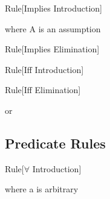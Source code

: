 \begin{namedthm}{Rule}[Implies Introduction]

\begin{bprooftree}
\end{bprooftree}\qquad where A is an assumption

\end{namedthm}

\begin{namedthm}{Rule}[Implies Elimination]

\begin{bprooftree}
\end{bprooftree}\qquad 

\end{namedthm}

\begin{namedthm}{Rule}[Iff Introduction]

\begin{bprooftree}
\end{bprooftree}\qquad 

\end{namedthm}

\begin{namedthm}{Rule}[Iff Elimination]

\begin{bprooftree}
\end{bprooftree}\qquad or \qquad
\begin{bprooftree}
\end{bprooftree}

\end{namedthm}

\subsection{Predicate Rules}
\label{appendix:nd-pred}

\begin{namedthm}{Rule}[$\forall$ Introduction]

\begin{bprooftree}
\end{bprooftree}\qquad where a is arbitrary \qquad

\end{namedthm}

